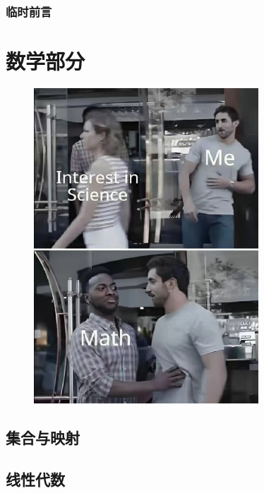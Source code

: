 \documentclass[zihao=-4,linespread=1.5,a4paper,heading=true,twoside]{ctexbook}
\theoremstyle{definition}
\theoremstyle{plain}
\begin{document}
\frontmatter
{}
\section*{临时前言}\label{sec:preface}


\tableofcontents
\mainmatter
{}

\part{数学部分}\label{sec:II}
\begin{figure}[p]
    \centering
    \includegraphics[width=0.75\textwidth]{images/math.jpg}
\end{figure}
\chapter{集合与映射}\label{sec:II.1}
\label{sec:II.1.1}
\label{sec:II.1.2}
\label{sec:II.1.3}

\chapter{线性代数}\label{sec:II.2}
\end{document}

